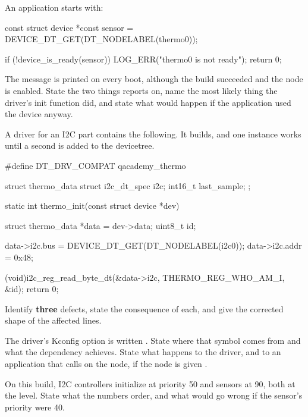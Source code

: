  An application starts with:

\begin{ccode}
const struct device *const sensor = DEVICE_DT_GET(DT_NODELABEL(thermo0));

if (!device_is_ready(sensor)) {
	LOG_ERR("thermo0 is not ready");
	return 0;
}
\end{ccode}

\noindent The message is printed on every boot, although the build succeeded and the node is
enabled. State the two things  reports on, name the most likely thing the
driver's init function did, and state what would happen if the application used the device anyway.

 A driver for an I2C part contains the following. It builds, and one instance works until a
second is added to the devicetree.

\begin{ccode}
#define DT_DRV_COMPAT qacademy_thermo

struct thermo_data {
	struct i2c_dt_spec i2c;
	int16_t last_sample;
};

static int thermo_init(const struct device *dev)
{
	struct thermo_data *data = dev->data;
	uint8_t id;

	data->i2c.bus = DEVICE_DT_GET(DT_NODELABEL(i2c0));
	data->i2c.addr = 0x48;

	(void)i2c_reg_read_byte_dt(&data->i2c, THERMO_REG_WHO_AM_I, &id);
	return 0;
}
\end{ccode}

\noindent Identify \textbf{three} defects, state the consequence of each, and give the corrected
shape of the affected lines. 

 The driver's Kconfig option is written .
State where that symbol comes from and what the dependency achieves. State what happens to the
driver, and to an application that calls  on the node, if the node is given
. 

 On this build, I2C controllers initialize at priority 50 and sensors at 90, both at the
 level. State what the numbers order, and what would go wrong if the sensor's
priority were 40. 

\label{exa:q:8}

